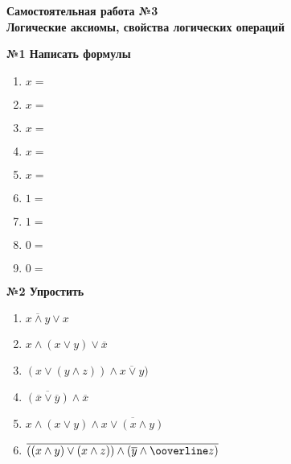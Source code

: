 



    \begin{center}
        \textbf{
            Самостоятельная работа №3\\Логические аксиомы, свойства логических операций
        }

        \textbf{№1 Написать формулы}
    \end{center}

    \begin{enumerate}
        \item $x = $
        \item $x = $
        \item $x = $
        \item $x = $
        \item $x = $
        \item $1 = $
        \item $1 = $
        \item $0 = $
        \item $0 = $
    \end{enumerate}

    \begin{center}
        \textbf{№2 Упростить}
    \end{center}
    \begin{enumerate}
        \item $\overline{x \wedge y} \vee x$
        \item $x \wedge (x \vee y) \vee \overline x$
        \item $(x \vee (y \wedge z))\wedge \overline{x \vee y})$
        \item $\overline{(\overline x \vee \overline y)} \wedge \overline x$
        \item $x \wedge (x \vee y) \wedge \overline{x \vee (x \wedge y)}$
        \item $\overline{((x \wedge y) \vee (x \wedge z)) \wedge (\overline y \wedge \ooverline z)}$
    \end{enumerate}

